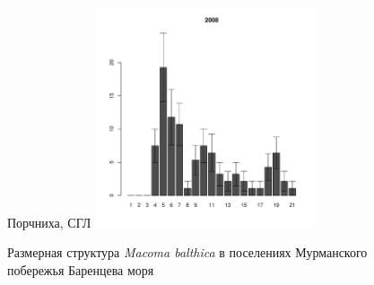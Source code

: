 \begin{figure}[hp]
\begin{minipage}[b]{.46\linewidth}
\begin{center}
	\end{center}
	\end{minipage}
	\hfil %
	\begin{minipage}[b]{.46\linewidth}
	\begin{center}
	{\tiny Порчниха, СГЛ}
	\includegraphics[width=65mm]{../Barenc_Sea/Porchnikha/sizestr2007.pdf}
	\end{center}
	\end{minipage}
\caption{Размерная структура {\it Macoma balthica} в поселениях Мурманского побережья Баренцева моря}
\label{ris:Barents_sizestr}
\end{figure}



